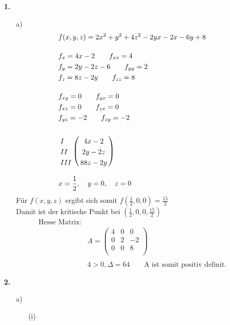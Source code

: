 \documentclass[a4paper,11pt]{article}
\title{\titleinfo}
\author{\authorinfotitle}
\date{\today}
\begin{document}
\maketitle
    \begin{enumerate}

            \item[\textbf{1.}]
            \begin{enumerate}
            	\item[a)]
            	\begin{align*}
	                &f(x,y,z) = 2x^2+y^2+4z^2-2yx-2x-6y+8 \\[0.4cm]
	                &f_x = 4x -2 \qquad f_{xx} = 4 \\
	                &f_y = 2y -2z -6 \qquad f_{yy} = 2\\
	                &f_z = 8z -2y \qquad f_{zz} = 8 \\[0.4cm]
	                &f_{xy} = 0 \qquad f_{yx} = 0 \\
	                &f_{xz} = 0 \qquad f_{zx} = 0 \\
	                &f_{yz} = -2 \qquad f_{zy} = -2 \\
					&\bordermatrix{
					  &  \cr
					I & 4x -2 \cr
					II & 2y-2z \cr
					III & 88z-2y \cr
					} \\[0.3cm]
	                &x= \frac{1}{2},\quad y = 0,\quad  z = 0 \\
	                \end{align*}
	                Für $f(x,y,z)$ ergibt sich somit $f\left(\frac{1}{2},0,0\right) = \frac{15}{2}$ \\
	                Damit ist der kritische Punkt bei $\left(\frac{1}{2},0,0,\frac{15}{2}\right)$
	                \begin{align*}
	                \text{Hesse Matrix:} \\
	                &A = \begin{pmatrix}
	                	 4 & 0 & 0 \\
	                	 0 & 2 & -2 \\
	                	 0 & 0 & 8 \\
	                \end{pmatrix} \\ \\ 
	                &4 > 0, \Delta = 64 \qquad \text{A ist somit positiv definit.}
            	\end{align*}

            \end{enumerate}
            \item[\textbf{2.}]
            \begin{enumerate}
            	\item[a)]
            		\begin{enumerate}
            			\item[(i)]
            			

\end{enumerate}
\end{enumerate}
\end{enumerate}
\end{document}
